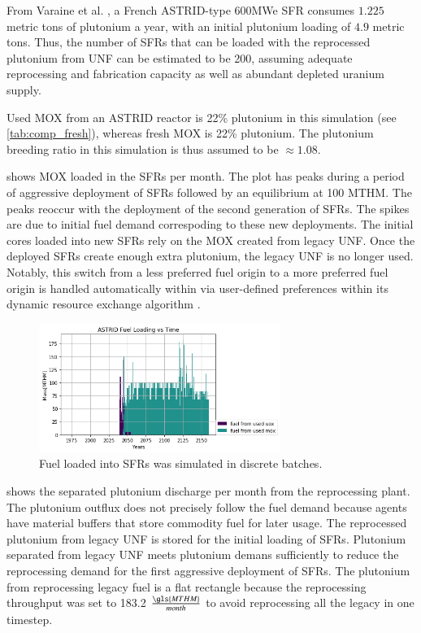 From Varaine et al. \cite{varaine_pre-conceptual_2012}, a French
ASTRID-type 600\gls{MWe} \gls{SFR} consumes $1.225$ metric tons of
plutonium a year, with an initial plutonium loading of $4.9$ metric tons. 
Thus, the number of \glspl{SFR} that can be loaded with the reprocessed
plutonium from \gls{UNF} can be estimated to be 200, assuming adequate 
reprocessing and fabrication capacity as well as abundant depleted uranium 
supply.
 
Used \gls{MOX} from an ASTRID reactor is 22\% plutonium
in this simulation (see \cref{tab:comp_fresh}), whereas fresh \gls{MOX} is 22\% plutonium.
The plutonium breeding ratio in this simulation is thus assumed to be
$\approx 1.08$.

 shows \gls{MOX} loaded in the \glspl{SFR} per month.  The plot 
has peaks during a period of aggressive deployment of \glspl{SFR} followed by 
an equilibrium at 100 \gls{MTHM}. The peaks reoccur with the deployment of the 
second generation of \glspl{SFR}.  The spikes are due to initial fuel demand 
correspoding to these new deployments.  The initial cores loaded into new 
\glspl{SFR} rely on the \gls{MOX} created from legacy \gls{UNF}. Once the 
deployed \glspl{SFR} create enough extra plutonium, the legacy \gls{UNF} is no 
longer used. Notably, this switch from a less preferred fuel origin to a more 
preferred fuel origin is handled automatically within \Cyclus via user-defined preferences 
within its dynamic resource exchange algorithm \cite{gidden_methodology_2016}.


\begin{figure}[htbp!]
	\begin{center}
		\includegraphics[width=0.7\textwidth]{./images/french-transition/where_fuel.png}
	\end{center}
	\caption{Fuel loaded into \glspl{SFR} was simulated in discrete 
        batches.}
	\label{fig:fuel}
\end{figure}

 shows the separated plutonium discharge per month from the reprocessing plant. The plutonium outflux does not precisely follow the fuel demand because \Cyclus agents have material buffers that store commodity fuel for later usage. The reprocessed plutonium from legacy \gls{UNF} is stored for the initial loading of \glspl{SFR}.  Plutonium separated from legacy \gls{UNF} meets plutonium demans sufficiently to reduce the reprocessing demand for the first aggressive deployment of \glspl{SFR}.  The plutonium from reprocessing legacy fuel is a flat rectangle because the reprocessing throughput was set to 183.2 $\frac{\gls{MTHM}}{month}$ to avoid reprocessing all the legacy in one timestep. 
 

